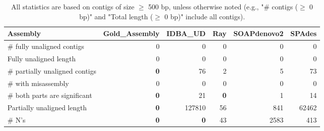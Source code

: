 \documentclass[12pt,a4paper]{article}
\begin{document}
\begin{table}[ht]
\begin{center}
\caption{All statistics are based on contigs of size $\geq$ 500 bp, unless otherwise noted (e.g., "\# contigs ($\geq$ 0 bp)" and "Total length ($\geq$ 0 bp)" include all contigs).}
\begin{tabular}{|l*{5}{|r}|}
\hline
Assembly & Gold\_Assembly & IDBA\_UD & Ray & SOAPdenovo2 & SPAdes \\ \hline
\# fully unaligned contigs & 0 & 0 & 0 & 0 & 0 \\ \hline
Fully unaligned length & 0 & 0 & 0 & 0 & 0 \\ \hline
\# partially unaligned contigs & {\bf 0} & 76 & 2 & 5 & 73 \\ \hline
\hspace{5mm}\# with misassembly & 0 & 0 & 0 & 0 & 0 \\ \hline
\hspace{5mm}\# both parts are significant & {\bf 0} & 21 & {\bf 0} & 1 & 14 \\ \hline
Partially unaligned length & {\bf 0} & 127810 & 56 & 841 & 62462 \\ \hline
\# N's & {\bf 0} & {\bf 0} & 43 & 2583 & 413 \\ \hline
\end{tabular}
\end{center}
\end{table}
\end{document}
